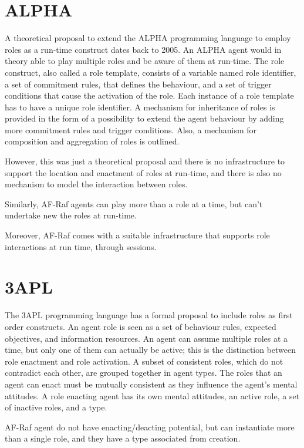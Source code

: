 \documentclass[a4paper,12pt,oneside,fleqn]{book} %
\begin{document}

\section{ALPHA} %
A theoretical proposal to extend the ALPHA programming language to employ roles
as a run-time construct dates back to 2005\cite{Collier_arole-based}. An
ALPHA agent would in theory able to play multiple roles and be aware of them at
run-time. The role construct, also called a role template, consists of a
variable named role identifier, a set of commitment rules, that defines the
behaviour, and a set of trigger conditions that cause the activation of
the role. Each instance of a role template has to have a unique role
identifier. A mechanism for inheritance of roles is provided in the form of
a possibility to  extend the agent behaviour by adding more commitment
rules and trigger conditions.  Also, a mechanism for composition and
aggregation of roles is outlined.

However, this was just a theoretical proposal and there is no
infrastructure to support the location and enactment of roles at run-time,
and there is also no mechanism to model the interaction between roles.

Similarly, AF-Raf agents can play more than a role at a time, but can't
undertake new the roles at run-time.

Moreover, AF-Raf comes with a suitable infrastructure that supports role
interactions at run time, through sessions.

\section{3APL} %
The 3APL programming language\cite{DBLP:conf/aose/DastaniRHDM04} has a
formal proposal to include roles as first order constructs. An agent role
is seen as a set of behaviour rules, expected objectives, and information
resources. An agent can assume multiple roles at a time, but only one of
them can actually be active; this is the distinction between role enactment
and role activation. A subset of consistent roles, which do not contradict
each other, are grouped together in agent types. The roles that an agent
can enact must be mutually consistent as they influence the agent's mental
attitudes. A role enacting agent has its own mental attitudes, an active
role, a set of inactive roles, and a type.

AF-Raf agent do not have enacting/deacting potential, but can instantiate
more than a single role, and they have a type associated from creation.
\end{document}

